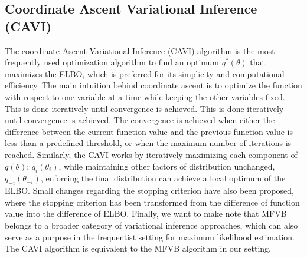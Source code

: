 \subsection{Coordinate Ascent Variational Inference (CAVI)}
The coordinate Ascent Variational Inference (CAVI) algorithm is the most frequently used optimization algorithm to find an optimum $q^*(\theta)$ that maximizes the ELBO, which is preferred for its simplicity and computational efficiency. The main intuition behind coordinate ascent is to optimize the function with respect to one variable at a time while keeping the other variables fixed. This is done iteratively until convergence is achieved. This is done iteratively until convergence is achieved. The convergence is achieved when either the difference between the current function value and the previous function value is less than a predefined threshold, or when the maximum number of iterations is reached.
Similarly, the CAVI works by iteratively maximizing each component of $q(\theta)$: $q_i(\theta_i)$, while maintaining other factors of distribution unchanged, $q_{-i}(\theta_{-i})$, enforcing the final distribution can achieve a local optimum of the ELBO. 
Small changes regarding the stopping criterion have also been proposed, where the stopping criterion has been transformed from the difference of function value into the difference of ELBO.
Finally, we want to make note that MFVB belongs to a broader category of variational inference approaches, which can also serve as a purpose in the frequentist setting for maximum likelihood estimation. The CAVI algorithm is equivalent to the MFVB algorithm in our setting.

